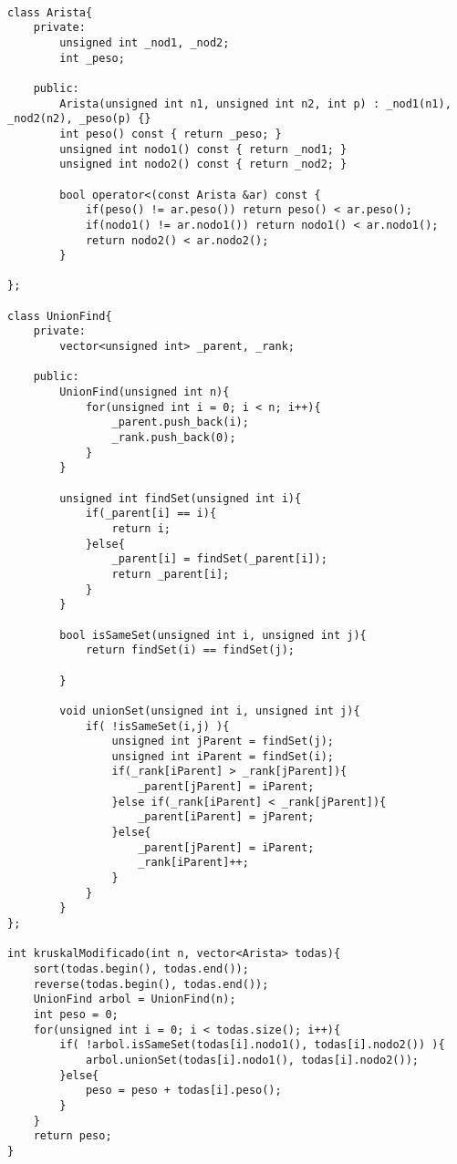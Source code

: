 \documentclass[a4paper]{article}
\begin{document}
\begin{lstlisting}[style=customc]

class Arista{
	private:
		unsigned int _nod1, _nod2;
		int _peso;
		
	public:
		Arista(unsigned int n1, unsigned int n2, int p) : _nod1(n1), _nod2(n2), _peso(p) {}
		int peso() const { return _peso; }
		unsigned int nodo1() const { return _nod1; }
		unsigned int nodo2() const { return _nod2; }
		
		bool operator<(const Arista &ar) const {
			if(peso() != ar.peso()) return peso() < ar.peso();
			if(nodo1() != ar.nodo1()) return nodo1() < ar.nodo1();
			return nodo2() < ar.nodo2();
		}

};

class UnionFind{
	private:
		vector<unsigned int> _parent, _rank;
		
	public:
		UnionFind(unsigned int n){
			for(unsigned int i = 0; i < n; i++){
				_parent.push_back(i);
				_rank.push_back(0);
			}
		}
		
		unsigned int findSet(unsigned int i){ 
			if(_parent[i] == i){
				return i;
			}else{
				_parent[i] = findSet(_parent[i]);
				return _parent[i];
			}
		}
		
		bool isSameSet(unsigned int i, unsigned int j){
			return findSet(i) == findSet(j);
			
		}
		
		void unionSet(unsigned int i, unsigned int j){
			if( !isSameSet(i,j) ){
				unsigned int jParent = findSet(j);
				unsigned int iParent = findSet(i);
				if(_rank[iParent] > _rank[jParent]){
					_parent[jParent] = iParent;
				}else if(_rank[iParent] < _rank[jParent]){
					_parent[iParent] = jParent;
				}else{
					_parent[jParent] = iParent;
					_rank[iParent]++; 
				}
			}
		}
};

int kruskalModificado(int n, vector<Arista> todas){
	sort(todas.begin(), todas.end());
	reverse(todas.begin(), todas.end());
	UnionFind arbol = UnionFind(n);
	int peso = 0;
	for(unsigned int i = 0; i < todas.size(); i++){
		if( !arbol.isSameSet(todas[i].nodo1(), todas[i].nodo2()) ){
			arbol.unionSet(todas[i].nodo1(), todas[i].nodo2());
		}else{
			peso = peso + todas[i].peso();
		}
	}
	return peso;
}

\end{lstlisting}











\end{document}
